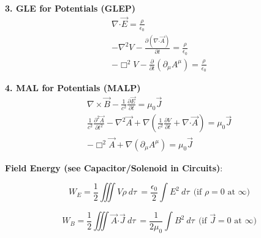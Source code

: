 \documentclass[12pt]{article}
\newcommand{\dotP}{\boldsymbol \cdot}		%
\begin{document}
\vspace{20pt}
\begin{minipage}[t]{0.48\textwidth}
	\textbf{3. GLE for Potentials (GLEP)}
	\begin{gather*}
		\nabla \dotP \vec{E} = \frac{\rho}{\epsilon_0} \\[10pt]
		- \nabla^2 V - \frac{\partial (\nabla \dotP \vec{A})}{\partial t} = \frac{\rho}{\epsilon_0} \\[10pt]
		\boxed{ - \Box^2 V - \frac{\partial}{\partial t} ( \partial_\mu A^\mu ) = \frac{\rho}{\epsilon_0} }
	\end{gather*}
\end{minipage} 
\hspace{0\textwidth}
\begin{minipage}[t]{0.48\textwidth}
	\textbf{4. MAL for Potentials (MALP)}
	\begin{gather*}
		\nabla \times \vec{B} - \frac{1}{c^2} \frac{\partial \vec{E}}{\partial t} = \mu_0 \vec{J} \\[10pt]
		\frac{1}{c^2} \frac{\partial^2 \vec{A}}{\partial t^2} - \nabla^2 \vec{A} 
			+ \nabla \left ( \frac{1}{c^2} \frac{\partial V}{\partial t} + \nabla \dotP \vec{A} \right )
			= \mu_0 \vec{J} 
			\\[10pt]
		\boxed{ - \Box^2 \vec{A} + \nabla ( \partial_\mu A^\mu )
			= \mu_0 \vec{J} }
	\end{gather*} 
\end{minipage} 

\vspace{30pt} \noindent
\textbf{Field Energy (see Capacitor/Solenoid in Circuits)}:

\vspace{10pt}
\begin{minipage}{.49\textwidth}
	\[ \boxed{W_E = \frac{1}{2} \iiint V \rho \ d\tau} 
		\ = \frac{\epsilon_0}{2} \int E^2 \ d\tau 
		\ \ \text{(if \(\rho=0\) at \(\infty\))} \]
\end{minipage}
\begin{minipage}{.49\textwidth}
	\[ \boxed{ W_B = \frac{1}{2} \iiint \vec{A} \dotP \vec{J} \ d\tau }
		\ = \frac{1}{2 \mu_0} \int B^2 \ d\tau 
		\ \ \text{(if \(\vec{J}=0\) at \(\infty\))} \]
\end{minipage}

%
%
\newpage
\end{document}
